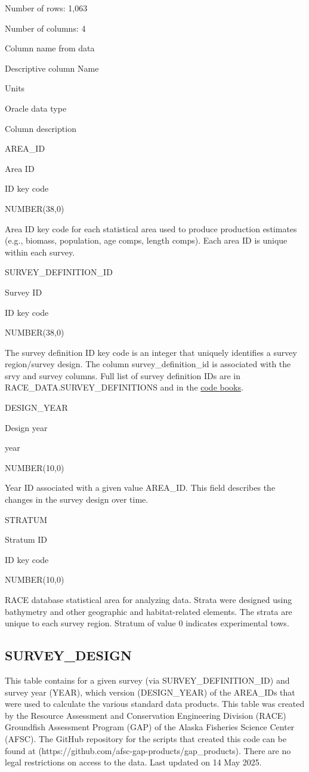 \documentclass[
  letterpaper,
  oneside,
  open=any]{scrbook}
\begin{document}
Number of rows: 1,063

Number of columns: 4

Column name from data

Descriptive column Name

Units

Oracle data type

Column description

AREA\_ID

Area ID

ID key code

NUMBER(38,0)

Area ID key code for each statistical area used to produce production
estimates (e.g., biomass, population, age comps, length comps). Each
area ID is unique within each survey.

SURVEY\_DEFINITION\_ID

Survey ID

ID key code

NUMBER(38,0)

The survey definition ID key code is an integer that uniquely identifies
a survey region/survey design. The column survey\_definition\_id is
associated with the srvy and survey columns. Full list of survey
definition IDs are in RACE\_DATA.SURVEY\_DEFINITIONS and in the
\href{https://www.fisheries.noaa.gov/resource/document/groundfish-survey-species-code-manual-and-data-codes-manual}{code
books}.

DESIGN\_YEAR

Design year

year

NUMBER(10,0)

Year ID associated with a given value AREA\_ID. This field describes the
changes in the survey design over time.

STRATUM

Stratum ID

ID key code

NUMBER(10,0)

RACE database statistical area for analyzing data. Strata were designed
using bathymetry and other geographic and habitat-related elements. The
strata are unique to each survey region. Stratum of value 0 indicates
experimental tows.

\subsection{SURVEY\_DESIGN}\label{survey_design}

This table contains for a given survey (via SURVEY\_DEFINITION\_ID) and
survey year (YEAR), which version (DESIGN\_YEAR) of the AREA\_IDs that
were used to calculate the various standard data products. This table
was created by the Resource Assessment and Conservation Engineering
Division (RACE) Groundfish Assessment Program (GAP) of the Alaska
Fisheries Science Center (AFSC). The GitHub repository for the scripts
that created this code can be found at
(https://github.com/afsc-gap-products/gap\_products). There are no legal
restrictions on access to the data. Last updated on 14 May 2025.
\end{document}
